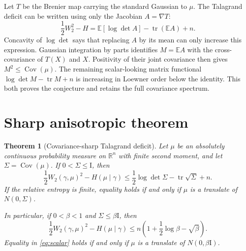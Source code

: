 \documentclass[11pt]{article}
\newcommand{\R}{\mathbb R}
\newcommand{\E}{\mathbb E}
\newcommand{\Cov}{\operatorname{Cov}}
\newcommand{\tr}{\operatorname{tr}}
\newcommand{\Id}{\mathrm I}
\newtheorem{theorem}{Theorem}
\begin{document}
Let $T$ be the Brenier map carrying the standard Gaussian to $\mu$.  The
Talagrand deficit can be written using only the Jacobian $A=\nabla T$:
\[
 \frac12W_2^2-H=\E[\log\det A]-\tr(\E A)+n.
\]
Concavity of $\log\det$ says that replacing $A$ by its mean can only increase
this expression.  Gaussian integration by parts identifies $M=\E A$ with the
cross-covariance of $T(X)$ and $X$.  Positivity of their joint covariance then
gives $M^2\leq\Cov(\mu)$.  The remaining scalar-looking matrix functional
$\log\det M-\tr M+n$ is increasing in Loewner order below the identity.  This
both proves the conjecture and retains the full covariance spectrum.

\section{Sharp anisotropic theorem}

\begin{theorem}[Covariance-sharp Talagrand deficit]\label{thm:main}
Let $\mu$ be an absolutely continuous probability measure on $\R^n$ with
finite second moment, and let $\Sigma=\Cov(\mu)$.  If
$0<\Sigma\leq\Id$, then
\begin{equation}\label{eq:matrix}
 \boxed{
 \frac12W_2(\gamma,\mu)^2-H(\mu\mid\gamma)
 \leq \frac12\log\det\Sigma-\tr\sqrt\Sigma+n.}
\end{equation}
If the relative entropy is finite, equality holds if and only if $\mu$ is a
translate of $N(0,\Sigma)$.

In particular, if $0<\beta<1$ and $\Sigma\leq\beta\Id$, then
\begin{equation}\label{eq:scalar}
 \frac12W_2(\gamma,\mu)^2-H(\mu\mid\gamma)
 \leq n\left(1+\frac12\log\beta-\sqrt\beta\right).
\end{equation}
Equality in \eqref{eq:scalar} holds if and only if $\mu$ is a translate of
$N(0,\beta\Id)$.
\end{theorem}
\end{document}
